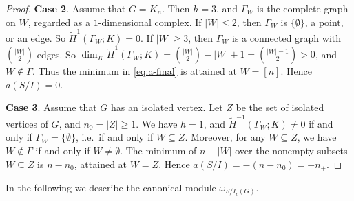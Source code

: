 \documentclass[12pt]{amsart}
\begin{document}
\begin{proof}
{\bf Case 2}. Assume that $G=K_n$. Then  $h=3$, and $\Gamma_W$ is the complete graph on $W$, regarded as a $1$-dimensional complex. If $|W|\le2$, then $\Gamma_W$ is $\{\emptyset\}$, a point, or an edge. So $\widetilde H^1(\Gamma_W;K)=0$. If $|W|\ge3$, then $\Gamma_W$ is a connected graph with $\binom{|W|}{2}$ edges. So $\dim_K\widetilde H^1(\Gamma_W;K)=\binom{|W|}{2}-|W|+1=\binom{|W|-1}{2}>0$, and $W\notin\Gamma$. Thus the minimum in \eqref{eq:a-final} is attained at $W=[n]$. Hence $a(S/I)=0$.

\smallskip
{\bf Case 3}. Assume that $G$ has an isolated vertex. 
Let $Z$ be the set of isolated vertices of $G$, and $n_0=|Z|\ge1$. We have $h=1$, and  $\widetilde H^{-1}(\Gamma_W;K)\neq0$ if and only if $\Gamma_W=\{\emptyset\}$, i.e.\ if and only if $W\subseteq Z$. Moreover, for any $W\subseteq Z$, we have $W\notin\Gamma$ if and only if $W\neq\emptyset$. The minimum of $n-|W|$ over the nonempty subsets $W\subseteq Z$ is $n-n_0$, attained at $W=Z$. Hence $a(S/I)=-(n-n_0)=-n_+$.
\end{proof}


In the following we describe the canonical module $\omega_{S/I_c(G)}$. 
\end{document}
